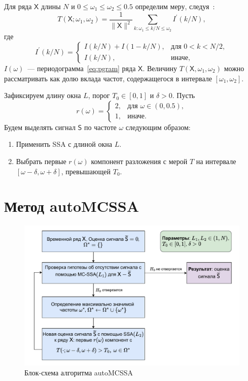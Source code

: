 \documentclass[specialist,
substylefile = spbu_report.rtx,
subf,href,colorlinks=true, 12pt]{disser}
\theoremstyle{definition}
\begin{document}
Для ряда $\mathsf{X}$ длины $N$ и $0\leqslant\omega_1\leqslant\omega_2\leqslant0.5$ определим меру, следуя~\cite{Alexandrov2009}:
\begin{equation}\label{eq:freq_measure}
	T(\mathsf{X};\omega_1,\omega_2)=\frac{1}{\|\mathsf{X}\|^2}\sum_{k:\omega_1\leqslant k/N\leqslant \omega_2}I^\prime(k/N),
\end{equation}
где \
$$
I^\prime(k / N)=
\begin{cases}
	I(k / N) + I(1 - k / N),& \text{для } 0<k<N/2,\\
	I(k / N), & \text{иначе},
\end{cases}
$$
$I(\omega)$~--- периодограмма~\eqref{eq:pgram} ряда $\mathsf{X}$. Величину $T(\mathsf{X},\omega_1,\omega_2)$ можно рассматривать как долю вклада частот, содержащегося в интервале $[\omega_1,\omega_2]$.

Зафиксируем длину окна $L$, порог $T_0\in[0, 1]$ и $\delta>0$. Пусть
\[
r(\omega)=
\begin{cases}
	2,& \text{для } \omega\in(0, 0.5),\\
	1,& \text{иначе}.
\end{cases}
\]
Будем выделять сигнал $\mathsf{S}$ по частоте $\omega$ следующим образом:
\begin{enumerate}
	\item Применить SSA с длиной окна $L$.
	\item Выбрать первые $r(\omega)$ компонент разложения с мерой $T$ на интервале $[\omega-\delta, \omega+\delta]$, превышающей $T_0$.
\end{enumerate}

\section{Метод autoMCSSA}\label{sect:autoMCSSA}

\begin{figure}[htbp]
	\centering
	\includegraphics[width=\textwidth]{img/auto_mcssa_alg.pdf}
	\caption{Блок-схема алгоритма autoMCSSA}
	\label{fig:autoMCSSA_alg}
\end{figure}
\end{document}
